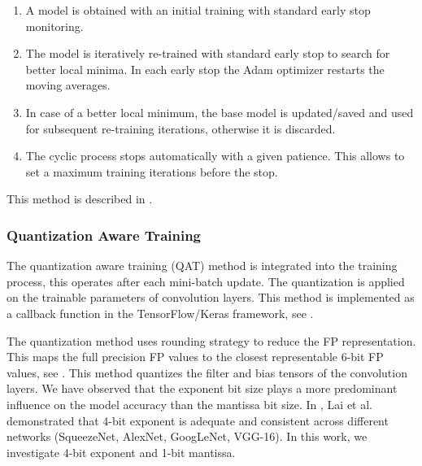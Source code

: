 \begin{enumerate}
	\item A model is obtained with an initial training with standard early stop monitoring.
	\item The model is iteratively re-trained with standard early stop to search for better local minima. In each early stop the Adam optimizer restarts the moving averages.
	\item In case of a better local minimum, the base model is updated/saved and used for subsequent re-training iterations, otherwise it is discarded.
	\item The cyclic process stops automatically with a given patience. This allows to set a maximum training iterations before the stop.
\end{enumerate}

This method is described in .

\subsubsection{Quantization Aware Training}
The quantization aware training (QAT) method is integrated into the training process, this operates after each mini-batch update. The quantization is applied on the trainable parameters of convolution layers. This method is implemented as a callback function in the TensorFlow/Keras framework, see .

The quantization method uses rounding strategy to reduce the FP representation. This maps the full precision FP values to the closest representable 6-bit FP values, see . This method quantizes the filter and bias tensors of the convolution layers. We have observed that the exponent bit size plays a more predominant influence on the model accuracy than the mantissa bit size. In \cite{lai2017deep}, Lai et al. demonstrated that 4-bit exponent is adequate and consistent across different networks (SqueezeNet, AlexNet, GoogLeNet, VGG-16). In this work, we investigate 4-bit exponent and 1-bit mantissa.

